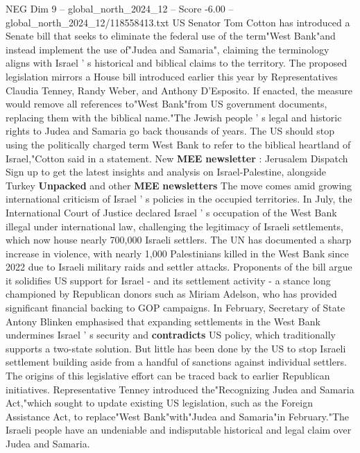 \begin{textsample}{NEG Dim 9 – global\_north\_2024\_12 – Score -6.00 – global\_north\_2024\_12/118558413.txt}  \label{ex:f9_neg_123}
US Senator Tom Cotton has introduced a Senate bill that seeks to eliminate the federal use of the term"West Bank"and instead implement the use of"Judea and Samaria", claiming the terminology aligns with Israel ' s historical and biblical claims to the territory.
The proposed legislation mirrors a House bill introduced earlier this year by Representatives Claudia Tenney, Randy Weber, and Anthony D'Esposito.
If enacted, the measure would remove all references to"West Bank"from US government documents, replacing them with the biblical name."The Jewish people ' s legal and historic rights to Judea and Samaria go back thousands of years.
The US should stop using the politically charged term West Bank to refer to the biblical heartland of Israel,"Cotton said in a statement.
New \textbf{MEE} \textbf{newsletter} : Jerusalem Dispatch Sign up to get the latest insights and analysis on Israel-Palestine, alongside Turkey \textbf{Unpacked} and other \textbf{MEE} \textbf{newsletters} The move comes amid growing international criticism of Israel ' s policies in the occupied territories.
In July, the International Court of Justice declared Israel ' s occupation of the West Bank illegal under international law, challenging the legitimacy of Israeli settlements, which now house nearly 700,000 Israeli settlers.
The UN has documented a sharp increase in violence, with nearly 1,000 Palestinians killed in the West Bank since 2022 due to Israeli military raids and settler attacks.
Proponents of the bill argue it solidifies US support for Israel - and its settlement activity - a stance long championed by Republican donors such as Miriam Adelson, who has provided significant financial backing to GOP campaigns.
In February, Secretary of State Antony Blinken emphasised that expanding settlements in the West Bank undermines Israel ' s security and \textbf{contradicts} US policy, which traditionally supports a two-state solution.
But little has been done by the US to stop Israeli settlement building aside from a handful of sanctions against individual settlers.
The origins of this legislative effort can be traced back to earlier Republican initiatives.
Representative Tenney introduced the"Recognizing Judea and Samaria Act,"which sought to update existing US legislation, such as the Foreign Assistance Act, to replace"West Bank"with"Judea and Samaria"in February."The Israeli people have an undeniable and indisputable historical and legal claim over Judea and Samaria.

\end{textsample}
